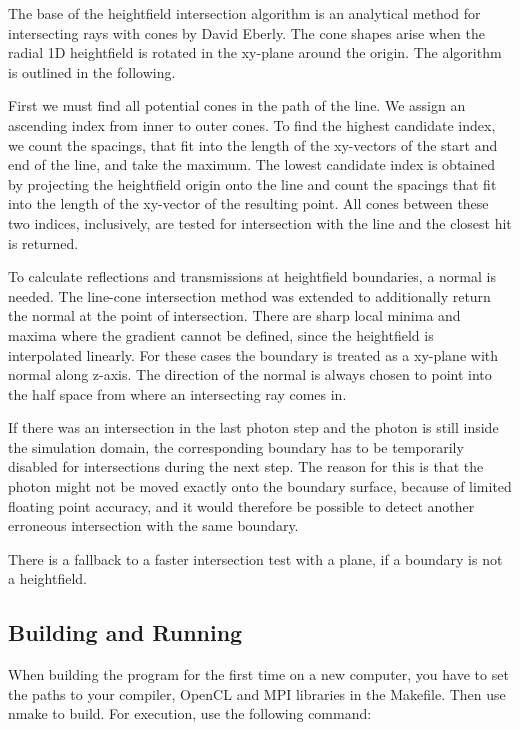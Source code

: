 \documentclass[]{article}
\begin{document}
The base of the heightfield intersection algorithm is an analytical method for intersecting rays with cones by David Eberly\cite{schneider2002geometric}. The cone shapes arise when the radial 1D heightfield is rotated in the xy-plane around the origin. The algorithm is outlined in the following.

First we must find all potential cones in the path of the line. We assign an ascending index from inner to outer cones. To find the highest candidate index, we count the spacings, that fit into the length of the xy-vectors of the start and end of the line, and take the maximum. The lowest candidate index is obtained by projecting the heightfield origin onto the line and count the spacings that fit into the length of the xy-vector of the resulting point. All cones between these two indices, inclusively, are tested for intersection with the line and the closest hit is returned.

To calculate reflections and transmissions at heightfield boundaries, a normal is needed. The line-cone intersection method was extended to additionally return the normal at the point of intersection. There are sharp local minima and maxima where the gradient cannot be defined, since the heightfield is interpolated linearly. For these cases the boundary is treated as a xy-plane with normal along z-axis. The direction of the normal is always chosen to point into the half space from where an intersecting ray comes in.

If there was an intersection in the last photon step and the photon is still inside the simulation domain, the corresponding boundary has to be temporarily disabled for intersections during the next step. The reason for this is that the photon might not be moved exactly onto the boundary surface, because of limited floating point accuracy, and it would therefore be possible to detect another erroneous intersection with the same boundary.

There is a fallback to a faster intersection test with a plane, if a boundary is not a heightfield.

\subsection{Building and Running}

When building the program for the first time on a new computer, you have to set the paths to your compiler, OpenCL and MPI libraries in the Makefile. Then use nmake to build. For execution, use the following command:
\end{document}
